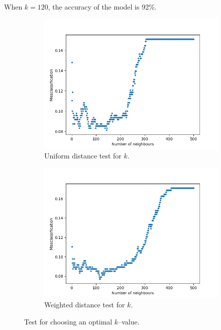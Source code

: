     When $k = 120$, the accuracy of the model is 92\%.
    
    \begin{figure}[htbp]
        \centering
        \begin{subfigure}{0.45\textwidth}
            \centering
            \includegraphics[width=\textwidth]{NYkNNtest1.png}
            \caption{Uniform distance test for $k$.}
            \label{fig:kNN_fig1}
        \end{subfigure}
        \hfill
        \begin{subfigure}{0.45\textwidth}
            \centering
            \includegraphics[width=\textwidth]{NYkNNtest2.png}
            \caption{Weighted distance test for $k$.}
            \label{fig:kNN_fig2}
        \end{subfigure}
        \caption{Test for choosing an optimal $k$--value.}
        \label{fig:kNN_comparison}
    \end{figure}

